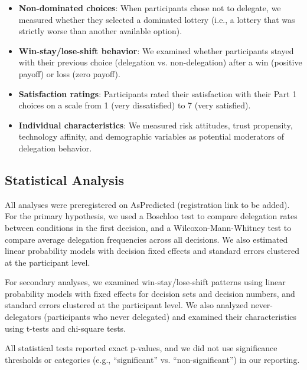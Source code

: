 \begin{itemize}
    \item \textbf{Non-dominated choices}: When participants chose not to delegate, we measured whether they selected a dominated lottery (i.e., a lottery that was strictly worse than another available option).
    \item \textbf{Win-stay/lose-shift behavior}: We examined whether participants stayed with their previous choice (delegation vs. non-delegation) after a win (positive payoff) or loss (zero payoff).
    \item \textbf{Satisfaction ratings}: Participants rated their satisfaction with their Part 1 choices on a scale from 1 (very dissatisfied) to 7 (very satisfied).
    \item \textbf{Individual characteristics}: We measured risk attitudes, trust propensity, technology affinity, and demographic variables as potential moderators of delegation behavior.
\end{itemize}

\subsection{Statistical Analysis}

All analyses were preregistered on AsPredicted (registration link to be added). For the primary hypothesis, we used a Boschloo test to compare delegation rates between conditions in the first decision, and a Wilcoxon-Mann-Whitney test to compare average delegation frequencies across all decisions. We also estimated linear probability models with decision fixed effects and standard errors clustered at the participant level.

For secondary analyses, we examined win-stay/lose-shift patterns using linear probability models with fixed effects for decision sets and decision numbers, and standard errors clustered at the participant level. We also analyzed never-delegators (participants who never delegated) and examined their characteristics using t-tests and chi-square tests.

All statistical tests reported exact p-values, and we did not use significance thresholds or categories (e.g., ``significant'' vs. ``non-significant'') in our reporting.